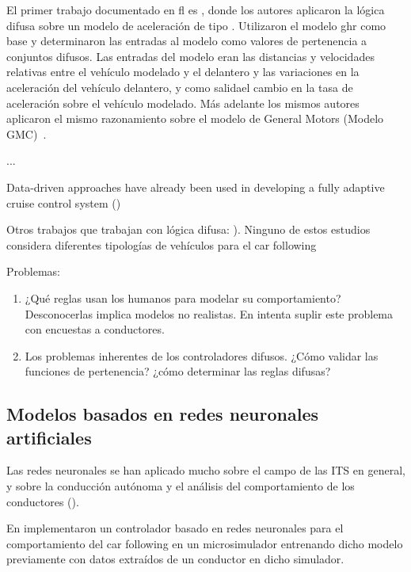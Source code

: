 El primer trabajo documentado en \gls{fl} es \cite{Kikuchi1992}, donde los autores aplicaron la lógica difusa sobre un modelo de aceleración de tipo \textit{}. Utilizaron el modelo \gls{ghr} como base y determinaron las entradas al modelo como valores de pertenencia a conjuntos difusos. Las entradas del modelo eran las distancias y velocidades relativas entre el vehículo modelado y el delantero y las variaciones en la aceleración del vehículo delantero, y como salidael cambio en la tasa de aceleración sobre el vehículo modelado. Más adelante los mismos autores aplicaron el mismo razonamiento sobre el modelo de General Motors (Modelo GMC)~\cite{Chakroborty1999}.

...

Data-driven approaches have already been used in developing a fully adaptive cruise control system (\cite{Simonelli2009, Bifulco2014})

Otros trabajos que trabajan con lógica difusa: \cite{Chakroborty2003, Das1999, Gao2008, Gonzalez-Rojo2000, Gonzalez-Rojo2002a, Hatipkarasulu2002, McDonald1997, Won2007, Zheng2005, Wu2003}). Ninguno de estos estudios considera diferentes tipologías de vehículos para el car following

Problemas:

\begin{enumerate}
	\item ¿Qué reglas usan los humanos para modelar su comportamiento? Desconocerlas implica modelos no realistas. En \cite{Wu2003} intenta suplir este problema con encuestas a conductores.
	\item Los problemas inherentes de los controladores difusos. ¿Cómo validar las funciones de pertenencia? ¿cómo determinar las reglas difusas?
\end{enumerate}

\subsection{Modelos basados en redes neuronales artificiales}

\cite{zheng2013}

Las redes neuronales se han aplicado mucho sobre el campo de las ITS en general, y sobre la conducción autónoma y el análisis del comportamiento de los conductores (\cite{Dougherty1995}).

En \cite{Fix1990} implementaron un controlador basado en redes neuronales para el comportamiento del car following en un microsimulador entrenando dicho modelo previamente con datos extraídos de un conductor en dicho simulador.

